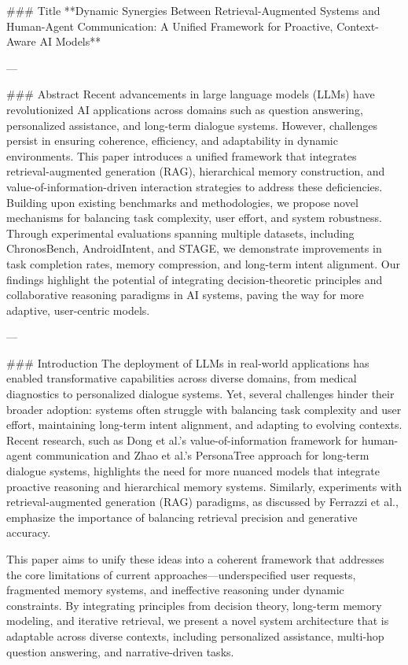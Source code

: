 ### Title  
**Dynamic Synergies Between Retrieval-Augmented Systems and Human-Agent Communication: A Unified Framework for Proactive, Context-Aware AI Models**

---

### Abstract  
Recent advancements in large language models (LLMs) have revolutionized AI applications across domains such as question answering, personalized assistance, and long-term dialogue systems. However, challenges persist in ensuring coherence, efficiency, and adaptability in dynamic environments. This paper introduces a unified framework that integrates retrieval-augmented generation (RAG), hierarchical memory construction, and value-of-information-driven interaction strategies to address these deficiencies. Building upon existing benchmarks and methodologies, we propose novel mechanisms for balancing task complexity, user effort, and system robustness. Through experimental evaluations spanning multiple datasets, including ChronosBench, AndroidIntent, and STAGE, we demonstrate improvements in task completion rates, memory compression, and long-term intent alignment. Our findings highlight the potential of integrating decision-theoretic principles and collaborative reasoning paradigms in AI systems, paving the way for more adaptive, user-centric models.

---

### Introduction  
The deployment of LLMs in real-world applications has enabled transformative capabilities across diverse domains, from medical diagnostics to personalized dialogue systems. Yet, several challenges hinder their broader adoption: systems often struggle with balancing task complexity and user effort, maintaining long-term intent alignment, and adapting to evolving contexts. Recent research, such as Dong et al.'s value-of-information framework for human-agent communication and Zhao et al.'s PersonaTree approach for long-term dialogue systems, highlights the need for more nuanced models that integrate proactive reasoning and hierarchical memory systems. Similarly, experiments with retrieval-augmented generation (RAG) paradigms, as discussed by Ferrazzi et al., emphasize the importance of balancing retrieval precision and generative accuracy. 

This paper aims to unify these ideas into a coherent framework that addresses the core limitations of current approaches—underspecified user requests, fragmented memory systems, and ineffective reasoning under dynamic constraints. By integrating principles from decision theory, long-term memory modeling, and iterative retrieval, we present a novel system architecture that is adaptable across diverse contexts, including personalized assistance, multi-hop question answering, and narrative-driven tasks.

